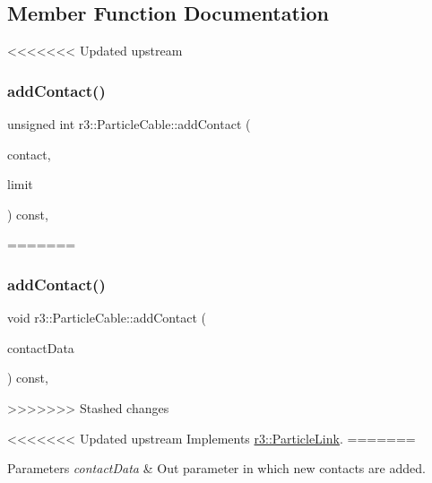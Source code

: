 \subsection{Member Function Documentation}
<<<<<<< Updated upstream
\mbox{\label{classr3_1_1_particle_cable_af8024236316ae2cf7bd68a0e906ed7c7}} 
\subsubsection{\texorpdfstring{add\+Contact()}{addContact()}}
{\footnotesize\ttfamily unsigned int r3\+::\+Particle\+Cable\+::add\+Contact (\begin{DoxyParamCaption}\item[{\mbox{\hyperlink{classr3_1_1_particle_contact}{Particle\+Contact}} $\ast$}]{contact,  }\item[{unsigned int}]{limit }\end{DoxyParamCaption}) const\hspace{0.3cm}{\ttfamily [override]}, {\ttfamily [virtual]}}
=======
\mbox{\label{classr3_1_1_particle_cable_a5187ee9d99fb41cf6e719c22c9b30a7c}} 
\subsubsection{\texorpdfstring{add\+Contact()}{addContact()}}
{\footnotesize\ttfamily void r3\+::\+Particle\+Cable\+::add\+Contact (\begin{DoxyParamCaption}\item[{\mbox{\hyperlink{classr3_1_1_fixed_size_container}{Fixed\+Size\+Container}}$<$ \mbox{\hyperlink{classr3_1_1_particle_contact}{Particle\+Contact}} $>$ \&}]{contact\+Data }\end{DoxyParamCaption}) const\hspace{0.3cm}{\ttfamily [override]}, {\ttfamily [virtual]}}


>>>>>>> Stashed changes



<<<<<<< Updated upstream
Implements \mbox{\hyperlink{classr3_1_1_particle_link_a07abe1381e0b5ed7e1597099dc0c072d}{r3\+::\+Particle\+Link}}.
=======
\begin{DoxyParams}{Parameters}
{\em contact\+Data} & Out parameter in which new contacts are added. \\
\hline
\end{DoxyParams}


